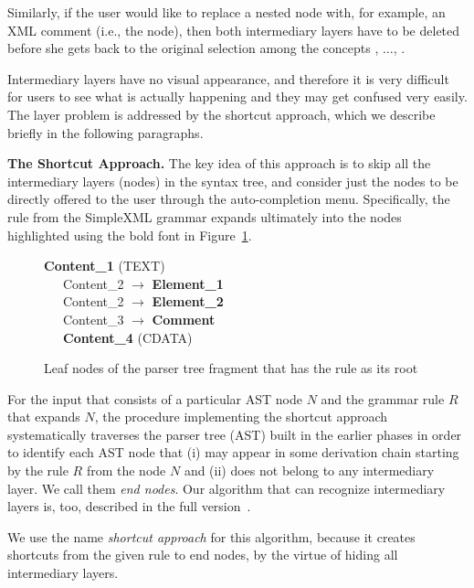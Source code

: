 Similarly, if the user would like to replace a nested  node with, for example, an XML comment (i.e., the  node), then both intermediary layers have to be deleted before she gets back to the original selection among the concepts , $\ldots$, .

Intermediary layers have no visual appearance, and therefore it is very difficult for users to see what is actually happening and they may get confused very easily.
The layer problem is addressed by the shortcut approach, which we describe briefly in the following paragraphs.

\noindent\textbf{The Shortcut Approach.}
The key idea of this approach is to skip all the intermediary layers (nodes) in the syntax tree, and consider just the nodes to be directly offered to the user through the auto-completion menu.
Specifically, the  rule from the SimpleXML grammar expands ultimately into the nodes highlighted using the bold font in Figure~\ref{fig:CONTENTEXPAND}.

\begin{figure}[ht]
\small
\textbf{Content{\_}1} (TEXT) \\
\ \ \ Content{\_}2 $\rightarrow$ \textbf{Element{\_}1} \\
\ \ \ Content{\_}2 $\rightarrow$ \textbf{Element{\_}2} \\
\ \ \ Content{\_}3 $\rightarrow$ \textbf{Comment} \\
\ \ \ \textbf{Content{\_}4} (CDATA)
\caption{Leaf nodes of the parser tree fragment that has the  rule as its root}
\label{fig:CONTENTEXPAND}
\vspace{-2mm}
\end{figure}

For the input that consists of a particular AST node $N$ and the grammar rule $R$ that expands $N$, the procedure implementing the shortcut approach systematically traverses the parser tree (AST) built in the earlier phases in order to identify each AST node that (i) may appear in some derivation chain starting by the rule $R$ from the node $N$ and (ii) does not belong to any intermediary layer.
We call them \emph{end nodes}.
Our algorithm that can recognize intermediary layers is, too, described in the full version~\cite{ref:TRFULL}.

We use the name \emph{shortcut approach} for this algorithm, because it creates shortcuts from the given rule to end nodes, by the virtue of hiding all intermediary layers.

